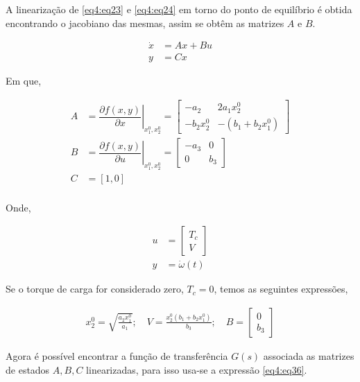 A linearização de  \ref{eq4:eq23} e \ref{eq4:eq24} em torno do ponto de equilíbrio é obtida encontrando o jacobiano das mesmas, assim se obtêm as matrizes $A$ e $B$.

\begin{align}
     \dot{x} &= Ax + Bu    \label{eq4:eq28}\\
     y &= Cx               \label{eq4:eq29}
\end{align}

Em que, 

\begin{align}
     A &= \left. \dfrac{\partial f(x,y)}{\partial x}\right|_{x_1^0, x_2^0} = \begin{bmatrix}
    -a_2       &   2a_1x_2^0\\
    -b_2x_2^0  & -(b_1+b_2x_1^0)
\end{bmatrix}    \label{eq4:eq30}\\
B &= \left. \dfrac{\partial f(x,y)}{\partial u}\right|_{x_1^0, x_2^0} = \begin{bmatrix}
    -a_3       &   0\\
    0  & b_3
\end{bmatrix}    \label{eq4:eq31}\\
C &= [1, 0]      \label{eq4:eq32}\\
\end{align}


Onde,

\begin{align}
    u &= \begin{bmatrix}
        T_c\\
        V
\end{bmatrix}           \label{eq4:eq33}\\
y &= \dot{\omega}(t)    \label{eq4:eq34}
\end{align}


Se o torque de carga for considerado zero, $T_c = 0$, temos as seguintes expressões,

\begin{align}
     x_2^0 = \sqrt{\frac{a_2x_1^0}{a_1}}; \quad
         V = \frac{x_2^0(b_1+b_2x_1^0)}{b_3}; \quad
         B = \begin{bmatrix}
        0\\
        b_3
\end{bmatrix}  \label{eq4:eq35}
\end{align}

Agora é possível encontrar a função de transferência $G(s)$ associada as matrizes de estados $A, B, C$ linearizadas, para isso usa-se a expressão \ref{eq4:eq36}.


